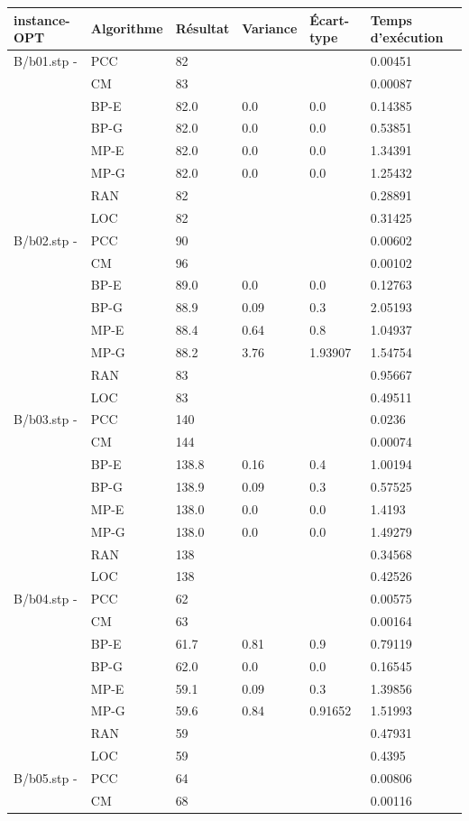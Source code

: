 \documentclass[12pt,a4paper]{article}
\begin{document}
\begin{center}
	\begin{tabular}{l|l|l|l|l|l}
		instance-OPT & Algorithme & Résultat & Variance & Écart-type & Temps d'exécution\\ \hline \hline
		B/b01.stp - &PCC&82&&&0.00451\\
		&CM&83&&&0.00087\\
		&BP-E&82.0&0.0&0.0&0.14385\\
		&BP-G&82.0&0.0&0.0&0.53851\\
		&MP-E&82.0&0.0&0.0&1.34391\\
		&MP-G&82.0&0.0&0.0&1.25432\\
		&RAN&82&&&0.28891\\
		&LOC&82&&&0.31425\\\hline
		B/b02.stp - &PCC&90&&&0.00602\\
		&CM&96&&&0.00102\\
		&BP-E&89.0&0.0&0.0&0.12763\\
		&BP-G&88.9&0.09&0.3&2.05193\\
		&MP-E&88.4&0.64&0.8&1.04937\\
		&MP-G&88.2&3.76&1.93907&1.54754\\
		&RAN&83&&&0.95667\\
		&LOC&83&&&0.49511\\\hline
		B/b03.stp - &PCC&140&&&0.0236\\
		&CM&144&&&0.00074\\
		&BP-E&138.8&0.16&0.4&1.00194\\
		&BP-G&138.9&0.09&0.3&0.57525\\
		&MP-E&138.0&0.0&0.0&1.4193\\
		&MP-G&138.0&0.0&0.0&1.49279\\
		&RAN&138&&&0.34568\\
		&LOC&138&&&0.42526\\\hline
		B/b04.stp - &PCC&62&&&0.00575\\
		&CM&63&&&0.00164\\
		&BP-E&61.7&0.81&0.9&0.79119\\
		&BP-G&62.0&0.0&0.0&0.16545\\
		&MP-E&59.1&0.09&0.3&1.39856\\
		&MP-G&59.6&0.84&0.91652&1.51993\\
		&RAN&59&&&0.47931\\
		&LOC&59&&&0.4395\\\hline
		B/b05.stp - &PCC&64&&&0.00806\\
		&CM&68&&&0.00116\\

\end{tabular}
\end{center}
\end{document}

